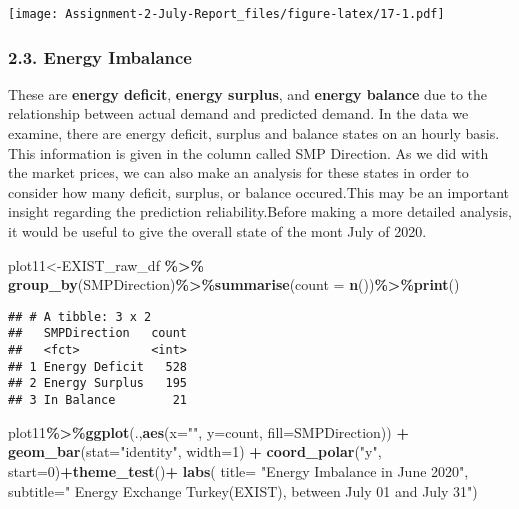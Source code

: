 \documentclass[
]{article}
\newenvironment{Shaded}{\begin{snugshade}}{\end{snugshade}}
\newcommand{\DataTypeTok}[1]{\textcolor[rgb]{0.13,0.29,0.53}{#1}}
\newcommand{\DecValTok}[1]{\textcolor[rgb]{0.00,0.00,0.81}{#1}}
\newcommand{\KeywordTok}[1]{\textcolor[rgb]{0.13,0.29,0.53}{\textbf{#1}}}
\newcommand{\NormalTok}[1]{#1}
\newcommand{\OperatorTok}[1]{\textcolor[rgb]{0.81,0.36,0.00}{\textbf{#1}}}
\newcommand{\StringTok}[1]{\textcolor[rgb]{0.31,0.60,0.02}{#1}}
\begin{document}
\texttt{[image: Assignment-2-July-Report\_files/figure-latex/17-1.pdf]}

\hypertarget{energy-imbalance}{%
\subsubsection{2.3. Energy Imbalance}\label{energy-imbalance}}

These are \textbf{energy deficit}, \textbf{energy surplus}, and
\textbf{energy balance} due to the relationship between actual demand
and predicted demand. In the data we examine, there are energy deficit,
surplus and balance states on an hourly basis. This information is given
in the column called SMP Direction. As we did with the market prices, we
can also make an analysis for these states in order to consider how many
deficit, surplus, or balance occured.This may be an important insight
regarding the prediction reliability.Before making a more detailed
analysis, it would be useful to give the overall state of the mont July
of 2020.

\begin{Shaded}
\begin{Highlighting}[]
\NormalTok{plot11\textless{}{-}EXIST\_raw\_df }\OperatorTok{\%\textgreater{}\%}\StringTok{ }\KeywordTok{group\_by}\NormalTok{(SMPDirection)}\OperatorTok{\%\textgreater{}\%}\KeywordTok{summarise}\NormalTok{(}\DataTypeTok{count =} \KeywordTok{n}\NormalTok{())}\OperatorTok{\%\textgreater{}\%}\KeywordTok{print}\NormalTok{()}
\end{Highlighting}
\end{Shaded}

\begin{verbatim}
## # A tibble: 3 x 2
##   SMPDirection   count
##   <fct>          <int>
## 1 Energy Deficit   528
## 2 Energy Surplus   195
## 3 In Balance        21
\end{verbatim}

\begin{Shaded}
\begin{Highlighting}[]
\NormalTok{plot11}\OperatorTok{\%\textgreater{}\%}\KeywordTok{ggplot}\NormalTok{(.,}\KeywordTok{aes}\NormalTok{(}\DataTypeTok{x=}\StringTok{""}\NormalTok{, }\DataTypeTok{y=}\NormalTok{count, }\DataTypeTok{fill=}\NormalTok{SMPDirection)) }\OperatorTok{+}\StringTok{ }\KeywordTok{geom\_bar}\NormalTok{(}\DataTypeTok{stat=}\StringTok{"identity"}\NormalTok{, }\DataTypeTok{width=}\DecValTok{1}\NormalTok{) }\OperatorTok{+}\StringTok{ }\KeywordTok{coord\_polar}\NormalTok{(}\StringTok{"y"}\NormalTok{, }\DataTypeTok{start=}\DecValTok{0}\NormalTok{)}\OperatorTok{+}\KeywordTok{theme\_test}\NormalTok{()}\OperatorTok{+}
\StringTok{      }\KeywordTok{labs}\NormalTok{( }\DataTypeTok{title=}  \StringTok{"Energy Imbalance in June 2020"}\NormalTok{,}
            \DataTypeTok{subtitle=}\StringTok{" Energy Exchange Turkey(EXIST), between July 01 and July 31"}\NormalTok{)}
\end{Highlighting}
\end{Shaded}
\end{document}
